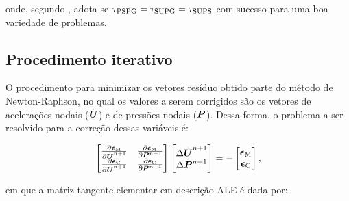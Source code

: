 \noindent onde, segundo , adota-se $\tau_{\mathrm{PSPG}}=\tau_{\mathrm{SUPG}}=\tau_{\mathrm{SUPS}}$ com sucesso para uma boa variedade de problemas.

\subsection{Procedimento iterativo} \label{Comp-VMS}

O procedimento para minimizar os vetores resíduo obtido parte do método de Newton-Raphson, no qual os valores a serem corrigidos são os vetores de acelerações nodais ($\dot{\boldsymbol{U}}$) e de pressões nodais ($\boldsymbol{P}$). Dessa forma, o problema a ser resolvido para a correção dessas variáveis é:

\begin{equation}
    \begin{bmatrix}
        \frac{\partial{\boldsymbol{\epsilon}_\mathrm{M}}}{\partial{\dot{\boldsymbol{U}}^{n+1}}} & \frac{\partial{\boldsymbol{\epsilon}_\mathrm{M}}}{\partial{\boldsymbol{P}^{n+1}}} \\
        \frac{\partial{\boldsymbol{\epsilon}_\mathrm{C}}}{\partial{\dot{\boldsymbol{U}}^{n+1}}} & \frac{\partial{\boldsymbol{\epsilon}_\mathrm{C}}}{\partial{\boldsymbol{P}^{n+1}}}
    \end{bmatrix}
    \begin{bmatrix}
        \Delta\dot{\boldsymbol{U}}^{n+1} \\
        \Delta\boldsymbol{P}^{n+1}
    \end{bmatrix}=-
    \begin{bmatrix}
        \boldsymbol{\epsilon}_\mathrm{M} \\
        \boldsymbol{\epsilon}_\mathrm{C}
    \end{bmatrix}\text{,}
    \label{Eq:NR-NS}
\end{equation}

\noindent em que a matriz tangente elementar em descrição ALE é dada por:

